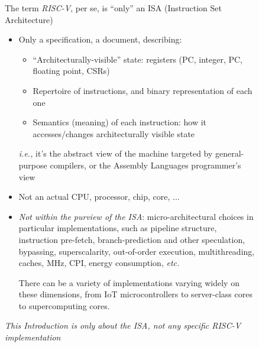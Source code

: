 \documentclass{article}
\newcommand{\ie}{\emph{i.e.,}}
\newcommand{\etc}{\emph{etc.}}
\begin{document}
\clearpage


\begin{figure}[htp]
    \centering
    {\Huge The term \emph{RISC-V}, per se, is ``only'' an ISA (Instruction Set Architecture)}

    \vspace{0.5in}

    \begin{minipage}{11in}\LARGE
      \begin{itemize}
      \item Only a specification, a document, describing:
        \begin{itemize}
        \item ``Architecturally-visible'' state: registers (PC, integer, PC, floating point, CSRs)
        \item Repertoire of instructions, and binary representation of each one
        \item Semantics (meaning) of each instruction: how it
          accesses/changes architecturally visible state
        \end{itemize}
        {\ie} it's the abstract view of the machine targeted by
        general-purpose compilers, or the Assembly Languages
        programmer's view

      \item Not an actual CPU, processor, chip, core, ...

      \item \emph{Not within the purview of the ISA}:
        micro-architectural choices in particular implementations,
        such as pipeline structure, instruction pre-fetch,
        branch-prediction and other speculation, bypassing,
        superscalarity, out-of-order execution, multithreading,
        caches, MHz, CPI, energy consumption, {\etc}

        There can be a variety of implementations varying widely on
        these dimensions, from IoT microcontrollers to server-class
        cores to supercomputing cores.
      \end{itemize}

      \vspace{0.5in}

      \begin{center}
        \emph{This Introduction is \emph{only} about the ISA, not any specific RISC-V implementation}
      \end{center}
    \end{minipage}
\end{figure}
\end{document}

